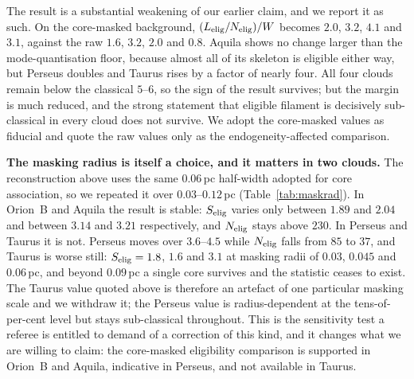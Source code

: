 \documentclass[usenatbib,twoside,twocolumn]{mnras}
\begin{document}
The result is a substantial weakening of our earlier claim, and we report it as such. On the core-masked background, $(L_{\rm elig}/N_{\rm elig})/W$ becomes $2.0$, $3.2$, $4.1$ and $3.1$, against the raw $1.6$, $3.2$, $2.0$ and $0.8$. Aquila shows no change larger than the mode-quantisation floor, because almost all of its skeleton is eligible either way, but Perseus doubles and Taurus rises by a factor of nearly four. All four clouds remain below the classical $5$--$6$, so the sign of the result survives; but the margin is much reduced, and the strong statement that eligible filament is decisively sub-classical in every cloud does not survive. We adopt the core-masked values as fiducial and quote the raw values only as the endogeneity-affected comparison.

\smallskip\noindent\textbf{The masking radius is itself a choice, and it matters in two clouds.} The reconstruction above uses the same $0.06$\,pc half-width adopted for core association, so we repeated it over $0.03$--$0.12$\,pc (Table~\ref{tab:maskrad}). In Orion~B and Aquila the result is stable: $S_{\rm elig}$ varies only between $1.89$ and $2.04$ and between $3.14$ and $3.21$ respectively, and $N_{\rm elig}$ stays above $230$. In Perseus and Taurus it is not. Perseus moves over $3.6$--$4.5$ while $N_{\rm elig}$ falls from $85$ to $37$, and Taurus is worse still: $S_{\rm elig}=1.8$, $1.6$ and $3.1$ at masking radii of $0.03$, $0.045$ and $0.06$\,pc, and beyond $0.09$\,pc a single core survives and the statistic ceases to exist. The Taurus value quoted above is therefore an artefact of one particular masking scale and we withdraw it; the Perseus value is radius-dependent at the tens-of-per-cent level but stays sub-classical throughout. This is the sensitivity test a referee is entitled to demand of a correction of this kind, and it changes what we are willing to claim: the core-masked eligibility comparison is supported in Orion~B and Aquila, indicative in Perseus, and not available in Taurus.
\end{document}
